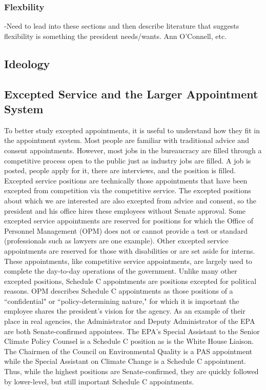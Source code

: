 \documentclass[12pt]{article}
\begin{document}
\subsubsection*{Flexbility}
-Need to lead into these sections and then describe literature that suggests flexibility is something the president needs/wants. Ann O'Connell, etc.
\subsection*{Ideology}


\subsection*{Excepted Service and the Larger Appointment System}

	To better study excepted appointments, it is useful to understand how they fit in the appointment system. Most people are familiar with traditional advice and consent appointments. However, most jobs in the bureaucracy are filled through a competitive process open to the public just as industry jobs are filled. A job is posted, people apply for it, there are interviews, and the position is filled. Excepted service positions are technically those appointments that have been excepted from competition via the competitive service. The excepted positions about which we are interested are also excepted from advice and consent, so the president and his office hires these employees without Senate approval. Some excepted service appointments are reserved for positions for which the Office of Personnel Management (OPM) does not or cannot provide a test or standard (professionals such as lawyers are one example). Other excepted service appointments are reserved for those with disabilities or are set aside for interns. These appointments, like competitive service appointments, are largely used to complete the day-to-day operations of the government.	Unlike many other excepted positions, Schedule C appointments are positions excepted for political reasons. OPM describes Schedule C appointments as those positions of a ``confidential" or ``policy-determining nature," for which it is important the employee shares the president's vision for the agency. As an example of their place in real agencies, the Administrator and Deputy Administrator of the EPA are both Senate-confirmed appointees. The EPA's Special Assistant to the Senior Climate Policy Counsel is a Schedule C position as is the White House Liaison. The Chairmen of the Council on Environmental Quality is a PAS appointment while the Special Assistant on Climate Change is a Schedule C appointment. Thus, while the highest positions are Senate-confirmed, they are quickly followed by lower-level, but still important Schedule C appointments. 
	
\end{document}
